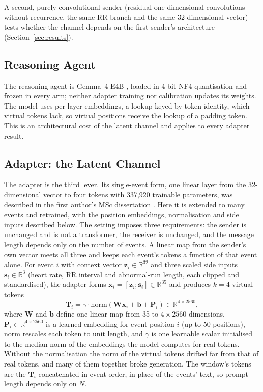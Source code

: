 A second, purely convolutional sender (residual one-dimensional convolutions without recurrence, the same RR branch and the same 32-dimensional vector) tests whether the channel depends on the first sender's architecture (Section~\ref{sec:results}).

\subsection{Reasoning Agent}
The reasoning agent is Gemma~4 E4B \cite{gemmateam2026gemma4}, loaded in 4-bit NF4 quantisation and frozen in every arm; neither adapter training nor calibration updates its weights. The model uses per-layer embeddings, a lookup keyed by token identity, which virtual tokens lack, so virtual positions receive the lookup of a padding token. This is an architectural cost of the latent channel and applies to every adapter result.

\subsection{Adapter: the Latent Channel}
The adapter is the third lever. Its single-event form, one linear layer from the 32-dimensional vector to four tokens with 337,920 trainable parameters, was described in the first author's MSc dissertation \cite{tasbir2026dissertation}. Here it is extended to many events and retrained, with the position embeddings, normalisation and side inputs described below. The setting imposes three requirements: the sender is unchanged and is not a transformer, the receiver is unchanged, and the message length depends only on the number of events. A linear map from the sender's own vector meets all three and keeps each event's tokens a function of that event alone. For event $i$ with context vector $\mathbf{z}_i \in \mathbb{R}^{32}$ and three scaled side inputs $\mathbf{s}_i \in \mathbb{R}^{3}$ (heart rate, RR interval and abnormal-run length, each clipped and standardised), the adapter forms $\mathbf{x}_i = [\mathbf{z}_i; \mathbf{s}_i] \in \mathbb{R}^{35}$ and produces $k=4$ virtual tokens
\begin{equation}
\mathbf{T}_i = \gamma \cdot \mathrm{norm}\!\left(\mathbf{W}\mathbf{x}_i + \mathbf{b} + \mathbf{P}_i\right) \in \mathbb{R}^{4 \times 2560},
\end{equation}
where $\mathbf{W}$ and $\mathbf{b}$ define one linear map from 35 to $4 \times 2560$ dimensions, $\mathbf{P}_i \in \mathbb{R}^{4\times 2560}$ is a learned embedding for event position $i$ (up to 50 positions), $\mathrm{norm}$ rescales each token to unit length, and $\gamma$ is one learnable scalar initialised to the median norm of the embeddings the model computes for real tokens. Without the normalisation the norm of the virtual tokens drifted far from that of real tokens, and many of them together broke generation. The window's tokens are the $\mathbf{T}_i$ concatenated in event order, in place of the events' text, so prompt length depends only on $N$.

